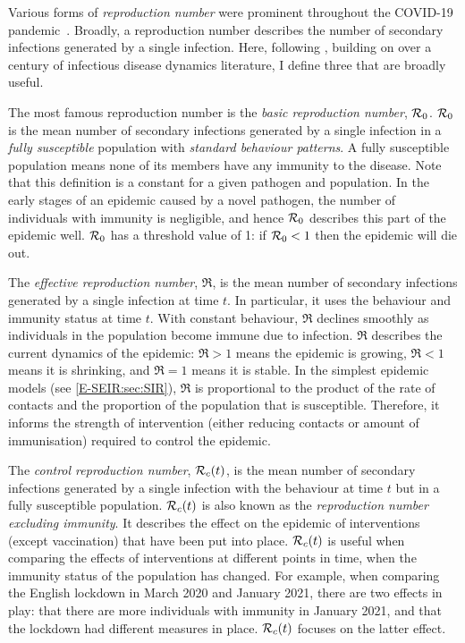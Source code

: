 \documentclass[thesis.tex]{subfiles}
\begin{document}
Various forms of \emph{reproduction number} were prominent throughout the COVID-19 pandemic~\autocite{pellisEstimation}.
Broadly, a reproduction number describes the number of secondary infections generated by a single infection.
Here, following \textcite{pellisEstimation},  building on over a century of infectious disease dynamics literature, I define three that are broadly useful.

The most famous reproduction number is the \emph{basic reproduction number}, $\mathcal{R}_{0}$.
$\mathcal{R}_{0}$ is the mean number of secondary infections generated by a single infection in a \emph{fully susceptible} population with \emph{standard behaviour patterns}.
A fully susceptible population means none of its members have any immunity to the disease.
Note that this definition is a constant for a given pathogen and population.
In the early stages of an epidemic caused by a novel pathogen, the number of individuals with immunity is negligible, and hence $\mathcal{R}_{0}$ describes this part of the epidemic well.
$\mathcal{R}_{0}$ has a threshold value of 1: if $\mathcal{R}_{0} < 1$ then the epidemic will die out.

The \emph{effective reproduction number}, $\Re$, is the mean number of secondary infections generated by a single infection at time $t$.
In particular, it uses the behaviour and immunity status at time $t$.
With constant behaviour, $\Re$ declines smoothly as individuals in the population become immune due to infection.
$\Re$ describes the current dynamics of the epidemic: $\Re > 1$ means the epidemic is growing, $\Re < 1$ means it is shrinking, and $\Re = 1$ means it is stable.
In the simplest epidemic models (see \cref{E-SEIR:sec:SIR}), $\Re$ is proportional to the product of the rate of contacts and the proportion of the population that is susceptible.
Therefore, it informs the strength of intervention (either reducing contacts or amount of immunisation) required to control the epidemic.

The \emph{control reproduction number}, $\mathcal{R}_{c}(t)$, is the mean number of secondary infections generated by a single infection with the behaviour at time $t$ but in a fully susceptible population.
$\mathcal{R}_{c}(t)$ is also known as the \emph{reproduction number excluding immunity}.
It describes the effect on the epidemic of interventions (except vaccination) that have been put into place.
$\mathcal{R}_{c}(t)$ is useful when comparing the effects of interventions at different points in time, when the immunity status of the population has changed.
For example, when comparing the English lockdown in March 2020 and January 2021, there are two effects in play: that there are more individuals with immunity in January 2021, and that the lockdown had different measures in place.
$\mathcal{R}_{c}(t)$ focuses on the latter effect.
\end{document}
